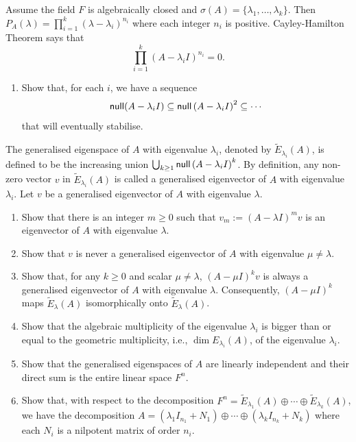 \begin{problem}
Assume the field $F$ is algebraically closed and $\sigma(A) = \{ \lambda_1, \ldots, \lambda_k \}$. Then $P_A (\lambda) = \prod_{i = 1}^k {(\lambda - \lambda_i)}^{n_i}$ where each integer $n_i$ is positive. Cayley-Hamilton Theorem says that
\begin{equation}
  \prod_{i = 1}^k {(A - \lambda_i I)}^{n_i} = 0.
\end{equation}
\begin{enumerate}
  \item Show that, for each $i$, we have a sequence
        \[
          \operatorname{\text{\normalfont\sffamily null}}(A - \lambda_i I) \subseteq \operatorname{\text{\normalfont\sffamily null}}{(A - \lambda_i I)}^2 \subseteq \cdots
        \]
        that will eventually stabilise.
\end{enumerate}

The generalised eigenspace of $A$ with eigenvalue $\lambda_i$, denoted by $\widetilde{E}_{\lambda_i} (A)$, is defined to be the increasing union $\bigcup_{k \geq 1} \operatorname{\text{\normalfont\sffamily null}}{(A - \lambda_i I)}^k$. By definition, any non-zero vector $v$ in $\widetilde{E}_{\lambda_i} (A)$ is called a generalised eigenvector of $A$ with eigenvalue $\lambda_i$. Let $v$ be a generalised eigenvector of $A$ with eigenvalue $\lambda$.

\begin{enumerate}\addtocounter{enumi}{1}
  \item Show that there is an integer $m \geq 0$ such that $v_m := {(A - \lambda I)}^m v$ is an eigenvector of $A$ with eigenvalue $\lambda$.
  \item Show that $v$ is never a generalised eigenvector of $A$ with eigenvalue $\mu \neq \lambda$.
  \item Show that, for any $k \geq 0$ and scalar $\mu \neq \lambda$, ${(A - \mu I)}^k v$ is always a generalised eigenvector of $A$ with eigenvalue $\lambda$. Consequently, ${(A - \mu I)}^k$ maps $\widetilde{E}_{\lambda} (A)$ isomorphically onto $\widetilde{E}_{\lambda} (A)$.
  \item Show that the algebraic multiplicity of the eigenvalue $\lambda_i$ is bigger than or equal to the geometric multiplicity, i.e., $\dim E_{\lambda_i} (A)$, of the eigenvalue $\lambda_i$.
  \item Show that the generalised eigenspaces of $A$ are linearly independent and their direct sum is the entire linear space $F^n$.
  \item Show that, with respect to the decomposition $F^n = \widetilde{E}_{\lambda_1} (A) \oplus \cdots \oplus \widetilde{E}_{\lambda_k} (A)$, we have the decomposition $A = (\lambda_1 I_{n_1} + N_1) \oplus \cdots \oplus (\lambda_k I_{n_k} + N_k)$ where each $N_i$ is a nilpotent matrix of order $n_i$.
\end{enumerate}
\end{problem}